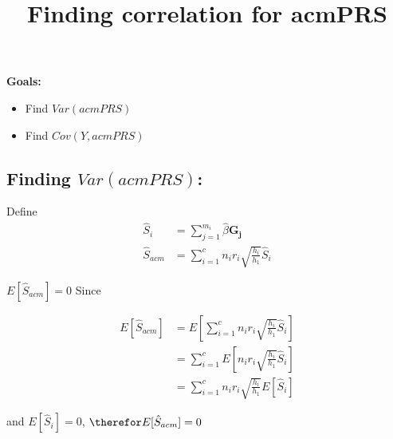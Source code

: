 \documentclass{article}
\begin{document}
\title{Finding correlation for acmPRS}

\maketitle

\textbf{Goals:}

\begin{itemize}
	\item Find $Var(acmPRS)$
	\item Find $Cov(Y, acmPRS)$
\end{itemize}

\subsection{Finding $Var(acmPRS)$:}

Define 
$$ 
\begin{aligned} 
\hat{S}_i &= \sum^{m_i}_{j = 1} \hat{\beta} \mathbf{G_j} \\
\hat{S}_{acm} &= \sum^c_{i=1} n_i r_i \sqrt{\frac{h_i}{h_1}} \hat{S}_i 
\end{aligned} 
$$




$E[\hat{S}_{acm}] = 0$ Since

$$ 
\begin{aligned}
E[\hat{S}_{acm}] &= E[\sum^c_{i=1} n_i r_i \sqrt{\frac{h_i}{h_1}} \hat{S}_i] \\
&= \sum^c_{i=1} E[n_i r_i \sqrt{\frac{h_i}{h_1}} \hat{S}_i] \\
&= \sum^c_{i=1} n_i r_i \sqrt{\frac{h_i}{h_1}} E[\hat{S}_i]
\end{aligned}
$$

and $E[\hat{S}_i] = 0$, $\therefor E[\hat{S}_{acm}] = 0$
\end{document}
